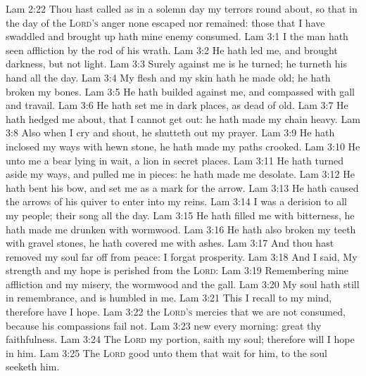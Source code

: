 \vs Lam 2:22 Thou hast called as in a solemn day my terrors round about, so that in the day of the \textsc{Lord's} anger none escaped nor remained: those that I have swaddled and brought up hath mine enemy consumed.
\vs Lam 3:1 I  the man  hath seen affliction by the rod of his wrath.
\vs Lam 3:2 He hath led me, and brought  darkness, but not  light.
\vs Lam 3:3 Surely against me is he turned; he turneth his hand  all the day.
\vs Lam 3:4 My flesh and my skin hath he made old; he hath broken my bones.
\vs Lam 3:5 He hath builded against me, and compassed  with gall and travail.
\vs Lam 3:6 He hath set me in dark places, as  dead of old.
\vs Lam 3:7 He hath hedged me about, that I cannot get out: he hath made my chain heavy.
\vs Lam 3:8 Also when I cry and shout, he shutteth out my prayer.
\vs Lam 3:9 He hath inclosed my ways with hewn stone, he hath made my paths crooked.
\vs Lam 3:10 He  unto me  a bear lying in wait,  a lion in secret places.
\vs Lam 3:11 He hath turned aside my ways, and pulled me in pieces: he hath made me desolate.
\vs Lam 3:12 He hath bent his bow, and set me as a mark for the arrow.
\vs Lam 3:13 He hath caused the arrows of his quiver to enter into my reins.
\vs Lam 3:14 I was a derision to all my people;  their song all the day.
\vs Lam 3:15 He hath filled me with bitterness, he hath made me drunken with wormwood.
\vs Lam 3:16 He hath also broken my teeth with gravel stones, he hath covered me with ashes.
\vs Lam 3:17 And thou hast removed my soul far off from peace: I forgat prosperity.
\vs Lam 3:18 And I said, My strength and my hope is perished from the \textsc{Lord}:
\vs Lam 3:19 Remembering mine affliction and my misery, the wormwood and the gall.
\vs Lam 3:20 My soul hath  still in remembrance, and is humbled in me.
\vs Lam 3:21 This I recall to my mind, therefore have I hope.
\vs Lam 3:22  the \textsc{Lord's} mercies that we are not consumed, because his compassions fail not.
\vs Lam 3:23  new every morning: great  thy faithfulness.
\vs Lam 3:24 The \textsc{Lord}  my portion, saith my soul; therefore will I hope in him.
\vs Lam 3:25 The \textsc{Lord}  good unto them that wait for him, to the soul  seeketh him.
